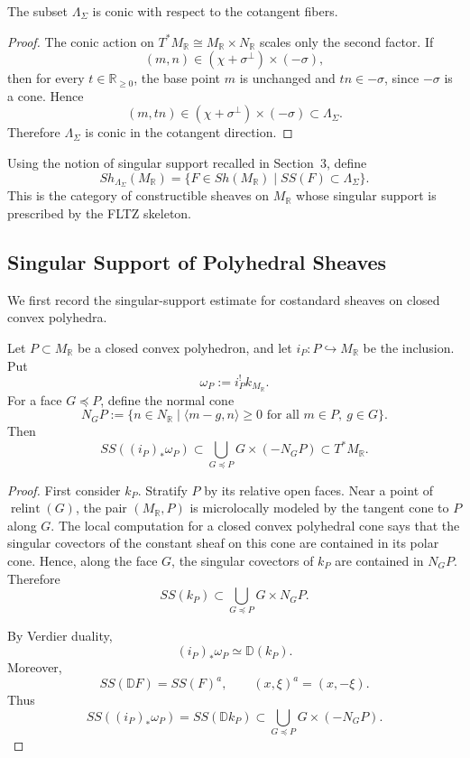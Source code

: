 \begin{proposition}\label{prop:fltz-conic}
The subset \(\Lambda_\Sigma\) is conic with respect to the cotangent fibers.
\end{proposition}

\begin{proof}
The conic action on \(T^*M_{\mathbb R}\cong M_{\mathbb R}\times N_{\mathbb R}\)
scales only the second factor. If
\[
(m,n)\in(\chi+\sigma^\perp)\times(-\sigma),
\]
then for every \(t\in\mathbb R_{\ge 0}\), the base point \(m\) is unchanged and
\(tn\in-\sigma\), since \(-\sigma\) is a cone. Hence
\[
(m,tn)\in(\chi+\sigma^\perp)\times(-\sigma)\subset\Lambda_\Sigma.
\]
Therefore \(\Lambda_\Sigma\) is conic in the cotangent direction.
\end{proof}

Using the notion of singular support recalled in Section~3, define
\[
Sh_{\Lambda_\Sigma}(M_{\mathbb R})
=
\{F\in Sh(M_{\mathbb R})\mid SS(F)\subset \Lambda_\Sigma\}.
\]
This is the category of constructible sheaves on \(M_{\mathbb R}\) whose
singular support is prescribed by the FLTZ skeleton.


\subsection{Singular Support of Polyhedral Sheaves}
We first record the singular-support estimate for costandard sheaves on
closed convex polyhedra.

\begin{lemma}
Let \(P\subset M_{\mathbb R}\) be a closed convex polyhedron, and let
\(i_P:P\hookrightarrow M_{\mathbb R}\) be the inclusion. Put
\[
\omega_P:=i_P^!k_{M_{\mathbb R}}.
\]
For a face \(G\preceq P\), define the normal cone
\[
N_GP:=
\{n\in N_{\mathbb R}\mid
\langle m-g,n\rangle\ge 0
\text{ for all }m\in P,\ g\in G\}.
\]
Then
\[
SS((i_P)_*\omega_P)
\subset
\bigcup_{G\preceq P}G\times(-N_GP)
\subset T^*M_{\mathbb R}.
\]
\end{lemma}

\begin{proof}
First consider \(k_P\). Stratify \(P\) by its relative open faces. Near a
point of \(\operatorname{relint}(G)\), the pair
\((M_{\mathbb R},P)\) is microlocally modeled by the tangent cone to \(P\)
along \(G\). The local computation for a closed convex polyhedral cone says
that the singular covectors of the constant sheaf on this cone are contained
in its polar cone. Hence, along the face \(G\), the singular covectors of
\(k_P\) are contained in \(N_GP\). Therefore
\[
SS(k_P)\subset
\bigcup_{G\preceq P}G\times N_GP .
\]

By Verdier duality,
\[
(i_P)_*\omega_P\simeq \mathbb D(k_P).
\]
Moreover,
\[
SS(\mathbb D F)=SS(F)^a,\qquad (x,\xi)^a=(x,-\xi).
\]
Thus
\[
SS((i_P)_*\omega_P)
=
SS(\mathbb D k_P)
\subset
\bigcup_{G\preceq P}G\times(-N_GP).
\]
\end{proof}




